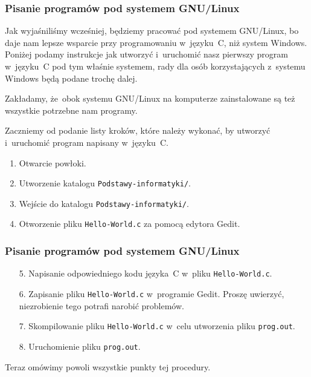 \documentclass[10pt,t]{beamer}
\begin{document}
\begin{frame}
  \frametitle{Pisanie programów pod systemem GNU/Linux}


  Jak wyjaśniliśmy wcześniej, będziemy pracować pod systemem GNU/Linux,
  bo daje nam lepsze wsparcie przy programowaniu w~języku~C, niż system
  Windows. Poniżej podamy instrukcje jak utworzyć i~uruchomić nasz pierwszy
  program w~języku~C pod tym właśnie systemem, rady dla osób korzystających
  z~systemu Windows będą podane trochę dalej.

  Zakładamy, że~obok systemu GNU/Linux na komputerze zainstalowane są też
  wszystkie potrzebne nam programy.

  Zaczniemy od podanie listy kroków, które należy wykonać, by utworzyć
  i~uruchomić program napisany w~języku~C.

  \begin{enumerate}

  \item Otwarcie powłoki.

  \item Utworzenie katalogu \texttt{Podstawy-informatyki/}.

  \item Wejście do katalogu \texttt{Podstawy-informatyki/}.

  \item Otworzenie pliku \texttt{Hello-World.c} za pomocą edytora Gedit.

  \end{enumerate}

\end{frame}





\begin{frame}
  \frametitle{Pisanie programów pod systemem GNU/Linux}


  \begin{enumerate}

  \item[5.] Napisanie odpowiedniego kodu języka~C w~pliku
    \texttt{Hello-World.c}.

  \item[6.] Zapisanie pliku \texttt{Hello-World.c} w~programie Gedit.
    Proszę uwierzyć, niezrobienie tego potrafi narobić problemów.

  \item[7.] Skompilowanie pliku \texttt{Hello-World.c} w~celu utworzenia
    pliku \texttt{prog.out}.

  \item[8.] Uruchomienie pliku \texttt{prog.out}.

  \end{enumerate}

  Teraz omówimy powoli wszystkie punkty tej procedury.

\end{frame}
\end{document}
